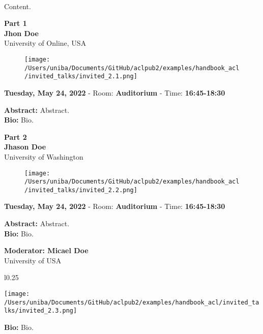 \begin{center}
\\
\end{center}
Content.
\\

\begin{center}
{\Large \textbf{Part 1}\\ \vspace*{0.2cm}}
   \textbf{Jhon Doe}\\
   {University of Online, USA}
\end{center}
\begin{figure}[h!]
  \centering
      \texttt{[image: /Users/uniba/Documents/GitHub/aclpub2/examples/handbook\_acl/invited\_talks/invited\_2.1.png]}
\end{figure}
\begin{center}
 {\normalsize \textbf{Tuesday, May 24, 2022} -
 Room: \textbf{Auditorium} -
 Time: \textbf{16:45-18:30}\\ \leavevmode\newline
 }
\end{center}

\textbf{Abstract:} Abstract. \\
\textbf{Bio:} Bio. \\

\clearpage

\begin{center}
{\Large \textbf{Part 2}\\}
   \vspace*{0.2cm}
   \textbf{Jhason Doe}\\
   {University of Washington}\\
\end{center}
\begin{figure}[h!]
  \centering
      \texttt{[image: /Users/uniba/Documents/GitHub/aclpub2/examples/handbook\_acl/invited\_talks/invited\_2.2.png]}
\end{figure}
\begin{center}
 {\normalsize \textbf{Tuesday, May 24, 2022} -
 Room: \textbf{Auditorium} -
 Time: \textbf{16:45-18:30}
 }
\end{center}

\textbf{Abstract:} Abstract.\\

\textbf{Bio:} Bio.

\leavevmode\newline \leavevmode\newline
{\Large \textbf{Moderator:  Micael Doe}\\}
{University of USA}

\begin{wrapfigure}{l}{0.25\textwidth}
  \begin{center}
    \texttt{[image: /Users/uniba/Documents/GitHub/aclpub2/examples/handbook\_acl/invited\_talks/invited\_2.3.png]}
  \end{center}
\end{wrapfigure}
\textbf{Bio:} Bio.

\clearpage